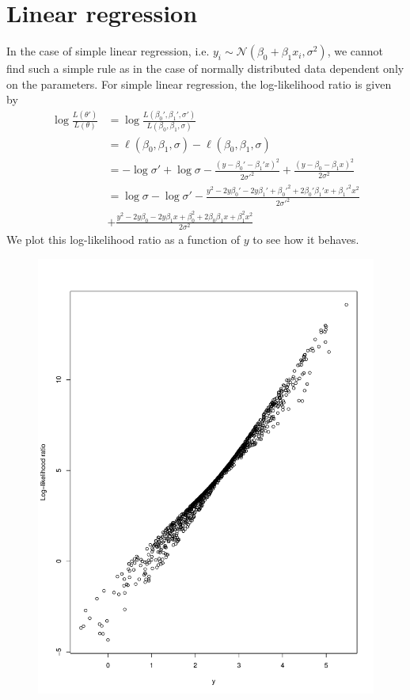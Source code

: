 {\section{Linear regression}
In the case of simple linear regression, i.e. $y_i \sim \mathcal{N}\left(\beta_0 + \beta_1 x_i, \sigma^2\right)$, we cannot find such a simple rule as in the case of normally distributed data dependent only on the parameters. 
For simple linear regression, the log-likelihood ratio is given by 
\begin{equation}
\begin{split}
    \log \frac{L\left(\theta'\right)}{L\left(\theta\right)} &= \log \frac{L\left(\beta_0', \beta_1', \sigma'\right)}{L\left(\beta_0, \beta_1, \sigma\right)}  \\
    & = \ell\left(\beta_0, \beta_1, \sigma\right) - \ell\left(\beta_0, \beta_1, \sigma\right) \\
    & = -\log\sigma' + \log\sigma - \frac{\left(y - \beta_0' - \beta_1'x\right)^2}{2\sigma'^2} + \frac{\left(y - \beta_0 - \beta_1x\right)^2}{2\sigma^2} \\
    & = \log \sigma - \log \sigma' - \frac{y^2 - 2y\beta_0'  - 2y\beta_1' + \beta_0'^2 + 2\beta_0'\beta_1'x + \beta_1'^2x^2 }{2\sigma'^2} \\ &+ \frac{y^2 - 2y\beta_0 - 2y\beta_1x + \beta_0^2 + 2\beta_0\beta_1x + \beta_1^2x^2}{2\sigma^2}
    \end{split}
\end{equation}
We plot this log-likelihood ratio as a function of $y$ to see how it behaves. 
\begin{figure}[H]
    \centering
    \includegraphics[scale = 0.7]{figures/loglik_ratio2.pdf}

\end{figure}}

